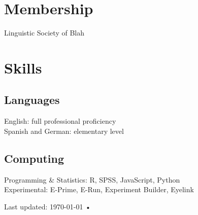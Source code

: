 \documentclass[11.5pt, a4paper]{article}
\newcommand{\years}[1]{\marginnote{\scriptsize #1}}
\begin{document}
\section*{\faUsers \thinspace Membership}

\years{2017-}Linguistic Society of Blah \\


\section*{\faWrench \thinspace Skills}

\subsection*{Languages}
English: full professional proficiency \\
Spanish and German: elementary level

\subsection*{Computing}
Programming \& Statistics: R, SPSS, JavaScript, Python \\
Experimental: E-Prime, E-Run, Experiment Builder, Eyelink \\




\vfill{}

\begin{center}
{\scriptsize  Last updated: \today\- •\- }
\end{center}
\end{document}
